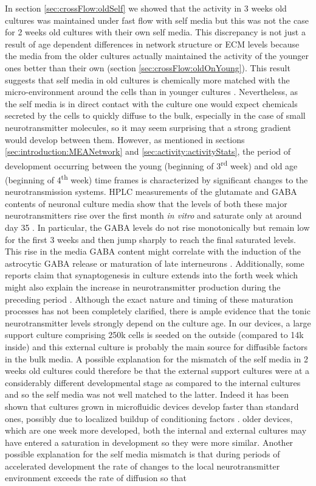 In section \ref{sec:crossFlow:oldSelf} we showed that the activity in 3 weeks old cultures was maintained under fast flow with self media but this was not the case for 2 weeks old cultures with their own self media. This discrepancy is not just a result of age dependent differences in network structure or ECM levels because the media from the older cultures actually maintained the activity of the younger ones better than their own (section \ref{sec:crossFlow:oldOnYoung}). This result suggests that self media in old cultures is chemically more matched with the micro-environment around the cells than in younger cultures . Nevertheless, as the self media is in direct contact with the culture one would expect chemicals secreted by the cells to quickly diffuse to the bulk, especially in the case of small neurotransmitter molecules, so it may seem surprising that a strong gradient would develop between them. However, as mentioned in sections \ref{sec:introduction:MEANetwork} and \ref{sec:activity:activityStats}, the period of development occurring between the young (beginning of 3\textsuperscript{rd} week) and old age (beginning of 4\textsuperscript{th} week) time frames is characterized by significant changes to the neurotransmission systems. HPLC measurements of the glutamate and GABA contents of neuronal culture media show that the levels of both these major neurotransmitters rise over the first month \textit{in vitro} and saturate only at around day 35 \cite{ramakers1994activity}. In particular, the GABA levels do not rise monotonically but remain low for the first 3 weeks and then jump sharply to reach the final saturated levels. This rise in the media GABA content might correlate with the induction of the astrocytic GABA release \cite{lee2010channel} or maturation of late interneurons \cite{hensch2005critical}. Additionally, some reports claim that synaptogenesis in culture extends into the forth week which might also explain the increase in neurotransmitter production during the preceding period \cite{brewer2008neuron,grabrucker2009synaptogenesis}. Although the exact nature and timing of these maturation processes has not been completely clarified, there is ample evidence that the tonic neurotransmitter levels strongly depend on the culture age. In our devices, a large support culture comprising 250k cells is seeded on the outside (compared to 14k inside) and this external culture is probably the main source for diffusible factors in the bulk media. A possible explanation for the mismatch of the self media in 2 weeks old cultures could therefore be that the external support cultures were at a considerably different developmental stage as compared to the internal cultures and so the self media was not well matched to the latter. Indeed it has been shown that cultures grown in microfluidic devices develop faster than standard ones, possibly due to localized buildup of conditioning factors \cite{goyal2011neuronal}. older devices, which are one week more developed, both the internal and external cultures may have entered a saturation in development so they were more similar. Another possible explanation for the self media mismatch is that during periods of accelerated development the rate of changes to the local neurotransmitter environment exceeds the rate of diffusion so that 